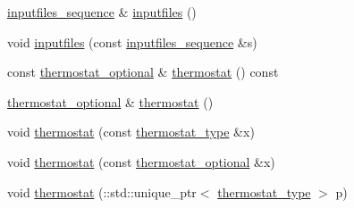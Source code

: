 \begin{DoxyCompactItemize}
\item 
\hyperlink{classsetting__t_a7f069827c89edb95e2b4347f1484b7b3}{inputfiles\+\_\+sequence} \& \hyperlink{classsetting__t_a0a2aedf27de864f84510d6ecc2ef88a4}{inputfiles} ()
\item 
void \hyperlink{classsetting__t_ad4ac719d4f104dbeca879cd2878279c8}{inputfiles} (const \hyperlink{classsetting__t_a7f069827c89edb95e2b4347f1484b7b3}{inputfiles\+\_\+sequence} \&s)
\item 
const \hyperlink{classsetting__t_a0e8b6cd8315d18962e1e25dea062eb1d}{thermostat\+\_\+optional} \& \hyperlink{classsetting__t_a868c5ea6ca0cc993da0b1121892b6ca0}{thermostat} () const 
\item 
\hyperlink{classsetting__t_a0e8b6cd8315d18962e1e25dea062eb1d}{thermostat\+\_\+optional} \& \hyperlink{classsetting__t_afa1315bea004877bbd323aa0bbf35867}{thermostat} ()
\item 
void \hyperlink{classsetting__t_a72c330930524383f579e8a4a1e55b8a8}{thermostat} (const \hyperlink{classsetting__t_a3c147644eb31a9319ad4df3b5827777f}{thermostat\+\_\+type} \&x)
\item 
void \hyperlink{classsetting__t_a6d248260df206acbd8683becba801a14}{thermostat} (const \hyperlink{classsetting__t_a0e8b6cd8315d18962e1e25dea062eb1d}{thermostat\+\_\+optional} \&x)
\item 
void \hyperlink{classsetting__t_a2ae87a15b65618d02b74f654453cac59}{thermostat} (\+::std\+::unique\+\_\+ptr$<$ \hyperlink{classsetting__t_a3c147644eb31a9319ad4df3b5827777f}{thermostat\+\_\+type} $>$ p)
\item 

\end{DoxyCompactItemize}
